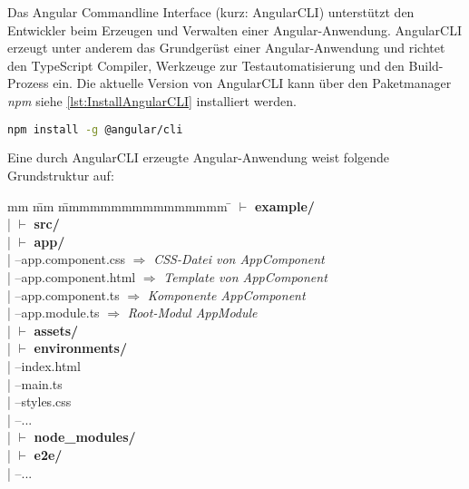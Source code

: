 Das Angular Commandline Interface (kurz: AngularCLI) unterstützt den Entwickler beim Erzeugen und Verwalten einer Angular-Anwendung. AngularCLI erzeugt unter anderem  das Grundgerüst einer Angular-Anwendung und richtet den TypeScript Compiler, Werkzeuge zur Testautomatisierung und den Build-Prozess ein. Die aktuelle Version von AngularCLI kann über den Paketmanager \textit{npm} siehe \autoref{lst:InstallAngularCLI} installiert werden. \autocites[vgl.][1\psqq]{Steyer.2017}[vgl.][8\psq]{Freeman.2018}



\begin{lstlisting}[caption=Installation von AngularCLI, label=lst:InstallAngularCLI, language=bash]
npm install -g @angular/cli
\end{lstlisting}

Eine durch AngularCLI erzeugte Angular-Anwendung weist folgende Grundstruktur auf:

\begin{tabbing}
	mm \= mm \= mmmmmmmmmmmmmmmm \= \kill
	$\vdash$ \textbf{example/} \\ 
	| \> $\vdash$ \textbf{src/}\\ 
	| \> \> $\vdash$  \textbf{app/}\\
	| \> \>  --app.component.css  $\Rightarrow$ \textit{CSS-Datei von AppComponent}\\ 
	| \> \>  --app.component.html  $\Rightarrow$ \textit{Template von AppComponent}\\
	| \> \>  --app.component.ts	 $\Rightarrow$ \textit{Komponente AppComponent}\\
	| \> \>  --app.module.ts  $\Rightarrow$ \textit{Root-Modul AppModule}\\
	| \> \> $\vdash$ \textbf{assets/} \\
	| \> \> $\vdash$ \textbf{environments/} \\
	| \> --index.html\\
	| \> --main.ts\\
	| \> --styles.css \\
	| \> --... \\
	| \> $\vdash$ \textbf{node\_modules/}\\ 
	| \> $\vdash$ \textbf{e2e/}\\   
	| --...\\
\end{tabbing}



